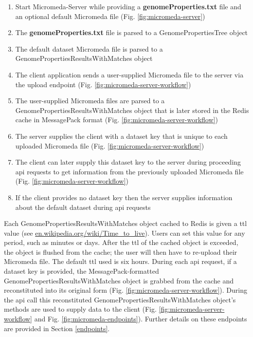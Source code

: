 \begin{enumerate}
  \item Start Micromeda-Server while providing a \textbf{genomeProperties.txt} 
file and an optional default Micromeda file (Fig. \ref{fig:micromeda-server})
  \item The \textbf{genomeProperties.txt} file is parsed to a 
GenomePropertiesTree object
  \item The default dataset Micromeda file is parsed to a 
GenomePropertiesResultsWithMatches object  
  \item The client application sends a user-supplied Micromeda file to the 
server via the upload endpoint (Fig. \ref{fig:micromeda-server-workflow})
  \item The user-supplied Micromeda files are parsed to a 
GenomePropertiesResultsWithMatches object that is later stored in the Redis 
cache in MessagePack format (Fig. \ref{fig:micromeda-server-workflow})
  \item The server supplies the client with a dataset key that is unique to each 
uploaded Micromeda file (Fig. \ref{fig:micromeda-server-workflow})
  \item The client can later supply this dataset key to the server during 
proceeding \gls{api} requests to get information from the previously uploaded 
Micromeda file (Fig. \ref{fig:micromeda-server-workflow})
  \item If the client provides no dataset key then the server supplies 
information about the default dataset during \gls{api} requests
\end{enumerate}

Each GenomePropertiesResultsWithMatches object cached to Redis is given a 
\gls{ttl} value \cite{gwertzman1996world} (see 
\href{http://en.wikipedia.org/wiki/Time_to_live}{en.wikipedia.org/wiki/Time\_to\_live}). 
Users can set this value for any period, such as minutes or days. After the 
\gls{ttl} of the cached object is exceeded, the object is flushed from the cache; the 
user will then have to re-upload their Micromeda file. The default \gls{ttl} 
used is six hours. During each \gls{api} request, if a dataset key is provided, 
the MessagePack-formatted GenomePropertiesResultsWithMatches object is grabbed 
from the cache and reconstituted into its original form (Fig. 
\ref{fig:micromeda-server-workflow}). During the \gls{api} call this 
reconstituted GenomePropertiesResultsWithMatches object's methods are used to 
supply data to the client  (Fig. \ref{fig:micromeda-server-workflow} and Fig. 
\ref{fig:micromeda-endpoints}). Further details on these endpoints are provided 
in Section \ref{endpoints}.

